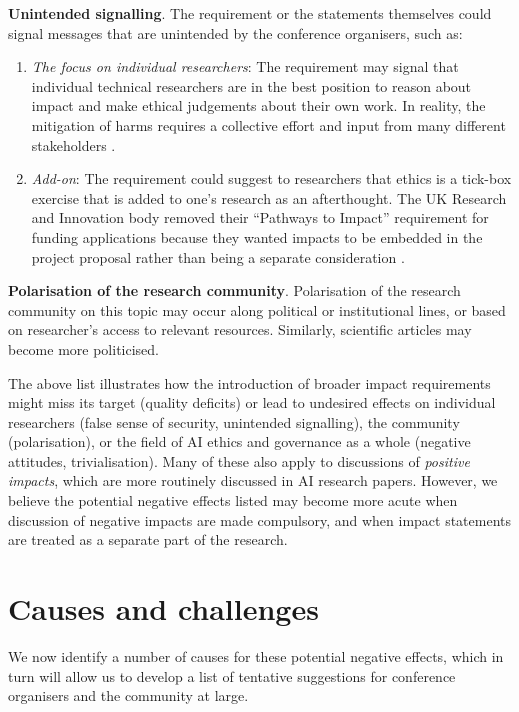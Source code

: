 \documentclass[11pt,english]{article}
\begin{document}
\textbf{Unintended signalling}. The requirement or the statements themselves could signal messages that are unintended by the conference organisers, such as:
\begin{enumerate}
\item \textit{The focus on individual researchers}: The requirement may signal that individual technical researchers are in the best position to reason about impact and make ethical judgements about their own work. In reality, the mitigation of harms requires a collective effort and input from many different stakeholders \citep{kenneally_cyber-security_2014}.
\item \textit{Add-on}: The requirement could suggest to researchers that ethics is a tick-box exercise that is added to one's research as an afterthought. The UK Research and Innovation body removed their ``Pathways to Impact'' requirement for funding applications because they wanted impacts to be embedded in the project proposal rather than being a separate consideration \citep{uk_research_and_innovation_pathways_2020}.
\end{enumerate}

\textbf{Polarisation of the research community}. Polarisation of the research community on this topic may occur along political or institutional lines, or based on researcher's access to relevant resources. Similarly, scientific articles may become more politicised. 

The above list illustrates how the introduction of broader impact requirements might miss its target (quality deficits) or lead to undesired effects on individual researchers (false sense of security, unintended signalling), the community (polarisation), or the field of AI ethics and governance as a whole (negative attitudes, trivialisation). Many of these also apply to discussions of \textit{positive impacts}, which are more routinely discussed in AI research papers. However, we believe the potential negative effects listed may become more acute when discussion of negative impacts are made compulsory, and when impact statements are treated as a separate part of the research.


\section{Causes and challenges}

We now identify a number of causes for these potential negative effects, which in turn will allow us to develop a list of tentative suggestions for conference organisers and the community at large.
\end{document}
